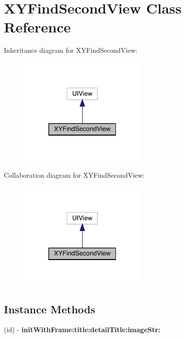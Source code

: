 \hypertarget{interface_x_y_find_second_view}{}\section{X\+Y\+Find\+Second\+View Class Reference}
\label{interface_x_y_find_second_view}


Inheritance diagram for X\+Y\+Find\+Second\+View\+:\nopagebreak
\begin{figure}[H]
\begin{center}
\leavevmode
\includegraphics[width=184pt]{interface_x_y_find_second_view__inherit__graph}
\end{center}
\end{figure}


Collaboration diagram for X\+Y\+Find\+Second\+View\+:\nopagebreak
\begin{figure}[H]
\begin{center}
\leavevmode
\includegraphics[width=184pt]{interface_x_y_find_second_view__coll__graph}
\end{center}
\end{figure}
\subsection*{Instance Methods}
\begin{DoxyCompactItemize}
\item 
\mbox{\label{interface_x_y_find_second_view_ae6912e80fb3968d87714b8866d74a27a}} 
(id) -\/ {\bfseries init\+With\+Frame\+:title\+:detail\+Title\+:image\+Str\+:}
\end{DoxyCompactItemize}
